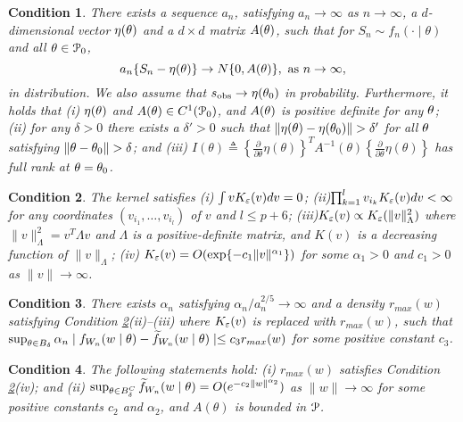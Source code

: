 \documentclass{article}
\newtheorem{condition}{Condition}
\begin{document}
\begin{condition} \label{sum_conv}
	There exists a sequence $a_{n}$, satisfying $a_{n}\rightarrow\infty$
	as $n\rightarrow\infty$, a $d$-dimensional vector $\eta({}{\theta})$
	and a $d\times d$ matrix $A({}{\theta})$, such that for $S_{n}\sim f_{n}(\cdot\mid\theta)$
	and all ${}{\theta}\in\mathcal{P}_{0}$, 
	\[
	a_{n}\{{}{S}_{n}-\eta({}{\theta})\}\rightarrow N\{0,A({}{\theta})\},\mbox{ as \ensuremath{n\rightarrow\infty}},
	\]
	in distribution. We also assume that ${}{s}_{\rm obs}\rightarrow\eta({}{\theta}_{0})$
	in probability. Furthermore, it holds that (i) $\eta({}{\theta})$
	and $A({}{\theta})\in C^{1}(\mathcal{P}_{0})$, and $A({}{\theta})$ is
	positive definite for any ${}{\theta}$; (ii) for any $\delta>0$ there
	exists a $\delta'>0$ such that $\|\eta(\btheta)-\eta(\btheta_{0})\|>\delta'$
	for all ${}{\theta}$ satisfying $\|\btheta-\btheta_{0}\|>\delta$; and
	(iii) $I(\theta)\triangleq\left\{ \frac{\partial}{\partial\theta}\eta(\theta)\right\} ^{T}A^{-1}(\theta)\left\{ \frac{\partial}{\partial\theta}\eta(\theta)\right\} $
	has full rank at ${}{\theta}={}{\theta}_{0}$.
\end{condition}

\begin{condition} \label{kernel_prop}
	The kernel satisfies (i) $\int vK_{\varepsilon}(v)dv=0$; (ii)$\prod_{k=1}^{l}v_{i_{k}}K_{\varepsilon}(v)dv<\infty$
	for any coordinates $(v_{i_{1}},\dots,v_{i_{l}})$ of $v$ and $l\leq p+6$;
	(iii)$K_{\varepsilon}(v)\propto K_{\varepsilon}(\|v\|_{\Lambda}^{2})$ where $\|v\|_{\Lambda}^{2}=v^{T}\Lambda v$
	and $\Lambda$ is a positive-definite matrix, and $K(v)$ is a decreasing
	function of $\|v\|_{\Lambda}$; (iv) $K_{\varepsilon}(v)=O(\exp\{-c_{1}\|v\|^{\alpha_{1}}\})$
	for some $\alpha_{1}>0$ and $c_{1}>0$ as $\|v\|\rightarrow\infty$. 
\end{condition}

\begin{condition} \label{sum_approx}
	There exists $\alpha_{n}$ satisfying $\alpha_{n}/a_{n}^{2/5}\rightarrow\infty$
	and a density $r_{max}(w)$ satisfying Condition \ref{kernel_prop}(ii)--(iii) where $K_{\varepsilon}(v)$
	is replaced with $r_{max}(w)$, such that $\sup_{\theta\in B_{\delta}}\alpha_{n}\mid f_{W_{n}}(w\mid\theta)-\widetilde{f}_{W_{n}}(w\mid\theta)\mid\leq c_{3}r_{max}(w)$
	for some positive constant $c_{3}$. 
\end{condition}

\begin{condition} \label{sum_approx_tail}
	The following statements hold: (i) $r_{max}(w)$ satisfies
	Condition \ref{kernel_prop}(iv); and (ii) $\sup_{\theta\in B_{\delta}^{C}}\widetilde{f}_{W_{n}}(w\mid\theta)=O(e^{-c_{2}\|w\|^{\alpha_{2}}})$
	as $\|w\|\rightarrow\infty$ for some positive constants $c_{2}$
	and $\alpha_{2}$, and $A(\theta)$ is bounded in ${\cal P}$. 
\end{condition}
\end{document}
